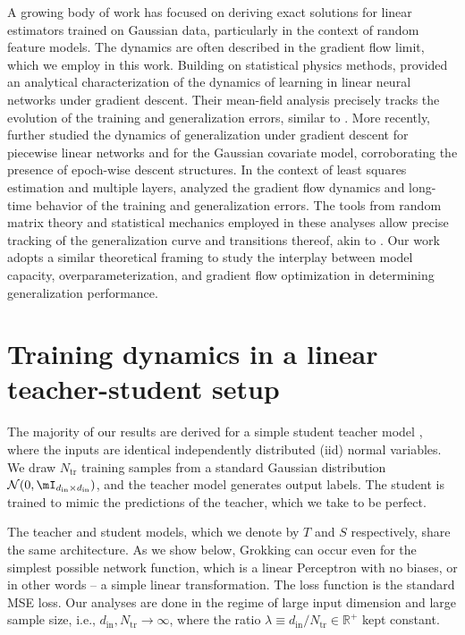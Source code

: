 \documentclass[a4paper,11pt]{article}
\newcommand{\din}{d_\mathrm{in}}
\newcommand{\training}{\mathrm{tr}}
\begin{document}
A growing body of work has focused on deriving exact solutions for linear estimators trained on Gaussian data, particularly in the context of random feature models. The dynamics are often described in the gradient flow limit, which we employ in this work. Building on statistical physics methods, \cite{crisanti2018dynamics} provided an analytical characterization of the dynamics of learning in linear neural networks under gradient descent. Their mean-field analysis precisely tracks the evolution of the training and generalization errors, similar to \cite{richards2021asymptotics}. More recently, \cite{bodin2021dynamics, bodin2022gradient} further studied the dynamics of generalization under gradient descent for piecewise linear networks and for the Gaussian covariate model, corroborating the presence of epoch-wise descent structures. In the context of least squares estimation and multiple layers, \cite{Loureiro_2022,goldt2020modelling} analyzed the gradient flow dynamics and long-time behavior of the training and generalization errors. The tools from random matrix theory and statistical mechanics employed in these analyses allow precise tracking of the generalization curve and transitions thereof, akin to \cite{dobriban2015highdimensional}. Our work adopts a similar theoretical framing to study the interplay between model capacity, overparameterization, and gradient flow optimization in determining generalization performance.

\section{Training dynamics in a linear teacher-student setup}
\label{sec:training_dynamics}

The majority of our results are derived for a simple student teacher model \cite{seung1992statistical}, where the inputs are identical independently distributed (iid) normal variables. We draw $N_\training$ training samples from a standard Gaussian distribution $\mathcal{N}(0, \mI_{\din \times \din })$, and the teacher model generates output labels. The student is trained to mimic the predictions of the teacher, which we take to be perfect.

The teacher and student models, which we denote by $T$ and $S$ respectively, share the same architecture. As we show below, Grokking can occur even for the simplest possible network function, which is a linear Perceptron with no biases, or in other words -- a simple linear transformation. The loss function is the standard MSE loss. 
%
Our analyses are done in the regime of large input dimension and large sample size, i.e., $\din,N_\training\to \infty$, where the ratio $\lambda\equiv \din/N_\training \in \mathbb{R}^+$ kept constant.
\end{document}
